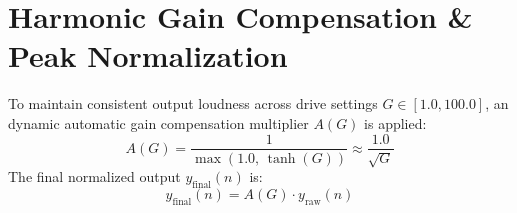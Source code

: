 \documentclass[11pt,a4paper]{article}
\begin{document}
\section{Harmonic Gain Compensation \& Peak Normalization}
To maintain consistent output loudness across drive settings $G \in [1.0, 100.0]$, an dynamic automatic gain compensation multiplier $A(G)$ is applied:
\begin{equation}
A(G) = \frac{1}{\max\left(1.0, \, \tanh(G)\right)} \approx \frac{1.0}{\sqrt{G}}
\end{equation}
The final normalized output $y_{\text{final}}(n)$ is:
\begin{equation}
y_{\text{final}}(n) = A(G) \cdot y_{\text{raw}}(n)
\end{equation}
\end{document}
